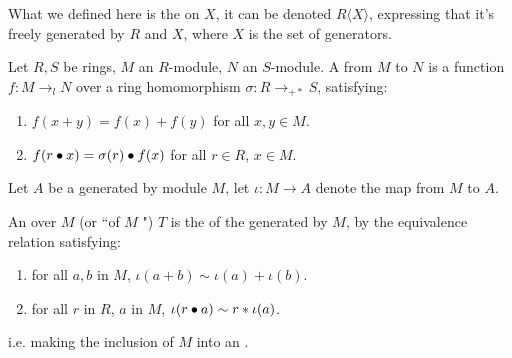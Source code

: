 \begin{remark}
    \label{mk:FreeAlgebra}

    What we defined here is the  on $X$, it can be denoted $R\langle X \rangle$,
    expressing that it's freely generated by $R$ and $X$, where $X$ is the set of generators.

\end{remark}

\begin{definition}
    \label{LinearMap}
    \leanok

    Let $R, S$ be rings, $M$ an $R$-module, $N$ an $S$-module.
    A  from $M$ to $N$ is a function $f : M \to_{l} N$ over a ring homomorphism $\sigma : R \to_{+*} S$, satisfying:

    \begin{enumerate}

    \item $f(x + y) = f(x) + f(y)$ for all $x, y \in M$.
    \item $f(r \bullet x) = \sigma(r) \bullet f(x)$ for all $r \in R$, $x \in M$.
    
    \end{enumerate}

\end{definition}

\begin{definition}
    \label{TensorAlgebra}
    \leanok

    Let $A$ be a  generated by module $M$, let $\iota : M \to A$ denote the map from $M$ to $A$.

    An  over $M$ (or ``of $M$ ") $T$ is the  of the  generated by $M$, 
    by the equivalence relation satisfying:

    \begin{enumerate}

    \item for all $a, b$ in $M$, $\iota(a + b) \sim \iota(a) + \iota(b)$.
    \item for all $r$ in $R$, $a$ in $M$, $\iota(r \bullet a) \sim r * \iota(a)$.
    
    \end{enumerate}

    i.e. making the inclusion of $M$ into an .

\end{definition}

